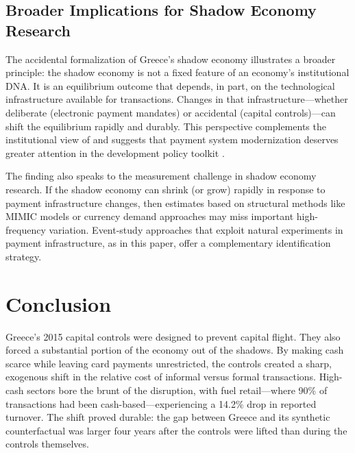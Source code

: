 \documentclass[12pt]{article}
\begin{document}
\subsection{Broader Implications for Shadow Economy Research}

The accidental formalization of Greece's shadow economy illustrates a broader principle: the shadow economy is not a fixed feature of an economy's institutional DNA. It is an equilibrium outcome that depends, in part, on the technological infrastructure available for transactions. Changes in that infrastructure---whether deliberate (electronic payment mandates) or accidental (capital controls)---can shift the equilibrium rapidly and durably. This perspective complements the institutional view of \citet{johnson1998regulatory} and suggests that payment system modernization deserves greater attention in the development policy toolkit \citep{bachas2024digital, rogoff2016curse}.

The finding also speaks to the measurement challenge in shadow economy research. If the shadow economy can shrink (or grow) rapidly in response to payment infrastructure changes, then estimates based on structural methods like MIMIC models \citep{danchev2020estimating, schneider2010new} or currency demand approaches may miss important high-frequency variation. Event-study approaches that exploit natural experiments in payment infrastructure, as in this paper, offer a complementary identification strategy.


\section{Conclusion}
\label{sec:conclusion}

Greece's 2015 capital controls were designed to prevent capital flight. They also forced a substantial portion of the economy out of the shadows. By making cash scarce while leaving card payments unrestricted, the controls created a sharp, exogenous shift in the relative cost of informal versus formal transactions. High-cash sectors bore the brunt of the disruption, with fuel retail---where 90\% of transactions had been cash-based---experiencing a 14.2\% drop in reported turnover. The shift proved durable: the gap between Greece and its synthetic counterfactual was larger four years after the controls were lifted than during the controls themselves.
\end{document}
